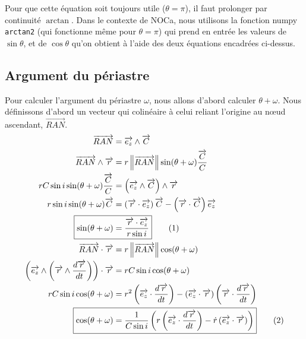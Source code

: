 \documentclass{report}
\begin{document}
Pour que cette équation soit toujours utile ($\theta =\pi$), il faut prolonger par continuité $\arctan$. Dans le contexte de NOCa, nous utilisons la fonction numpy \verb|arctan2| (qui fonctionne même pour $\theta=\pi$) qui prend en entrée les valeurs de $\sin\theta$, et de $\cos\theta$ qu'on obtient à l'aide des deux équations encadrées ci-dessus.

\subsection{Argument du périastre}

Pour calculer l'argument du périastre $\omega$, nous allons d'abord  calculer $\theta+\omega$. Nous définissons d'abord un vecteur qui colinéaire à celui reliant l'origine au nœud ascendant, $\overrightarrow{RAN}$.
\begin{align*}
\overrightarrow{RAN}&=\overrightarrow{e_z}\wedge\overrightarrow C\\
\overrightarrow{RAN}\wedge\overrightarrow r&=r\left\|\overrightarrow{RAN}\right\|\sin(\theta+\omega)\frac{\overrightarrow C}{C}\\
rC\sin i\sin(\theta+\omega)\frac{\overrightarrow C}{C}&=\left(\overrightarrow{e_z}\wedge\overrightarrow C\right)\wedge\overrightarrow r\\
r\sin i\sin(\theta+\omega)\overrightarrow C
&=\left(\overrightarrow r\cdot\overrightarrow{e_z}\right)\overrightarrow C-\left(\overrightarrow r\cdot\overrightarrow C\right)\overrightarrow{e_z}\\
\Aboxed{\sin(\theta+\omega)&=\frac{\overrightarrow r\cdot\overrightarrow{e_z}}{r\sin i}}
\stepcounter{equation}\tag{\theequation}\label{eq:sintheta+omega}\\
\overrightarrow{RAN}\cdot\overrightarrow r&=r\left\|\overrightarrow{RAN}\right\|\cos(\theta+\omega)\\
\left(\overrightarrow{e_z}\wedge\left(\overrightarrow r\wedge\frac{d\overrightarrow r}{dt}\right)\right)\cdot\overrightarrow r&=
rC\sin i\cos(\theta+\omega)\\
rC\sin i\cos(\theta+\omega)&=r^2\left(\overrightarrow{e_z}\cdot\frac{d\overrightarrow r}{dt}\right)
-\left(\overrightarrow{e_z}\cdot\overrightarrow r\right)\left(\overrightarrow r\cdot\frac{d\overrightarrow r}{dt}\right)\\
\Aboxed{\cos(\theta+\omega)
&=\frac{1}{C\sin i}\left(r\left(\overrightarrow{e_z}\cdot\frac{d\overrightarrow r}{dt}\right)-\dot r\left(\overrightarrow{e_z}\cdot\overrightarrow r\right)\right)}
\stepcounter{equation}\tag{\theequation}\label{eq:costheta+omega}
\end{align*}
\end{document}
